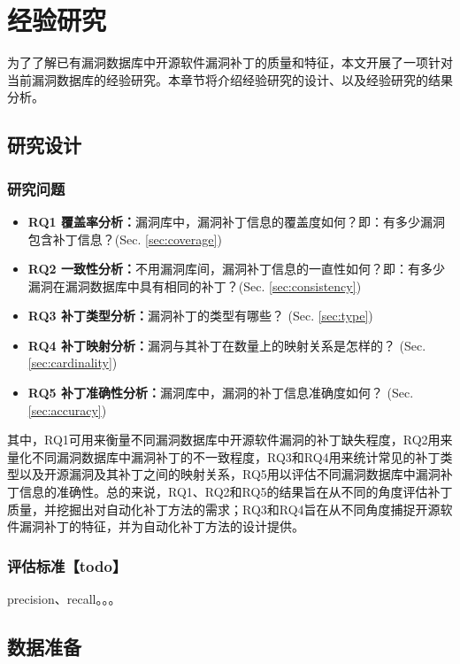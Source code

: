 \chapter{经验研究}



为了了解已有漏洞数据库中开源软件漏洞补丁的质量和特征，本文开展了一项针对当前漏洞数据库的经验研究。本章节将介绍经验研究的设计、以及经验研究的结果分析。


\section{研究设计}
\subsection{研究问题}
\begin{itemize}[leftmargin=*]
    \item \textbf{RQ1 覆盖率分析：}漏洞库中，漏洞补丁信息的覆盖度如何？即：有多少漏洞包含补丁信息？(Sec. \ref{sec:coverage})
    \item \textbf{RQ2 一致性分析：}不用漏洞库间，漏洞补丁信息的一直性如何？即：有多少漏洞在漏洞数据库中具有相同的补丁？(Sec. \ref{sec:consistency})
    \item \textbf{RQ3 补丁类型分析：}漏洞补丁的类型有哪些？ (Sec. \ref{sec:type})
    \item \textbf{RQ4 补丁映射分析：}漏洞与其补丁在数量上的映射关系是怎样的？ (Sec. \ref{sec:cardinality})
    \item \textbf{RQ5 补丁准确性分析：}漏洞库中，漏洞的补丁信息准确度如何？ (Sec. \ref{sec:accuracy})
\end{itemize}
    
其中，RQ1可用来衡量不同漏洞数据库中开源软件漏洞的补丁缺失程度，RQ2用来量化不同漏洞数据库中漏洞补丁的不一致程度，RQ3和RQ4用来统计常见的补丁类型以及开源漏洞及其补丁之间的映射关系，RQ5用以评估不同漏洞数据库中漏洞补丁信息的准确性。总的来说，RQ1、RQ2和RQ5的结果旨在从不同的角度评估补丁质量，并挖掘出对自动化补丁方法的需求；RQ3和RQ4旨在从不同角度捕捉开源软件漏洞补丁的特征，并为自动化补丁方法的设计提供。

\subsection{评估标准【todo】}
precision、recall。。。

\section{数据准备}\label{sec:preparation}
